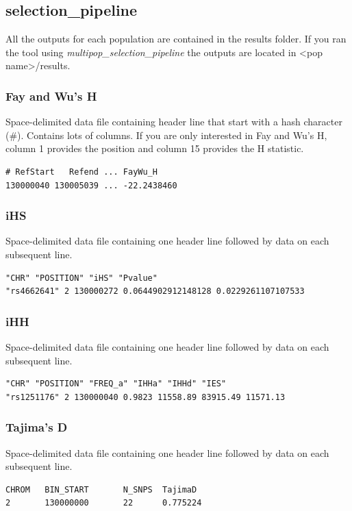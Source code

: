 \documentclass[a4paper,10pt]{article}
\begin{document}
\subsection{selection\_pipeline}
All the outputs for each population are contained in the results folder. If you ran the tool using \emph{multipop\_selection\_pipeline} the outputs are located in <pop name>/results. 
\subsubsection{Fay and Wu's H}
Space-delimited data file containing header line that start with a hash character (\#). Contains lots of columns. If you are only interested in Fay and Wu's H, column 1 provides the position and column 15 provides the H statistic. \\
\begin{verbatim}
# RefStart   Refend ... FayWu_H
130000040 130005039 ... -22.2438460
\end{verbatim}
\subsubsection{iHS}
Space-delimited data file containing one header line followed by data on each subsequent line.\\
\begin{verbatim}
"CHR" "POSITION" "iHS" "Pvalue"
"rs4662641" 2 130000272 0.0644902912148128 0.0229261107107533
\end{verbatim}
\subsubsection{iHH}
Space-delimited data file containing one header line followed by data on each subsequent line.\\
\begin{verbatim}
"CHR" "POSITION" "FREQ_a" "IHHa" "IHHd" "IES"
"rs1251176" 2 130000040 0.9823 11558.89 83915.49 11571.13
\end{verbatim}
\subsubsection{Tajima's D}
Space-delimited data file containing one header line followed by data on each subsequent line.\\
\begin{verbatim}
CHROM   BIN_START       N_SNPS  TajimaD
2       130000000       22      0.775224
\end{verbatim}
\end{document}
